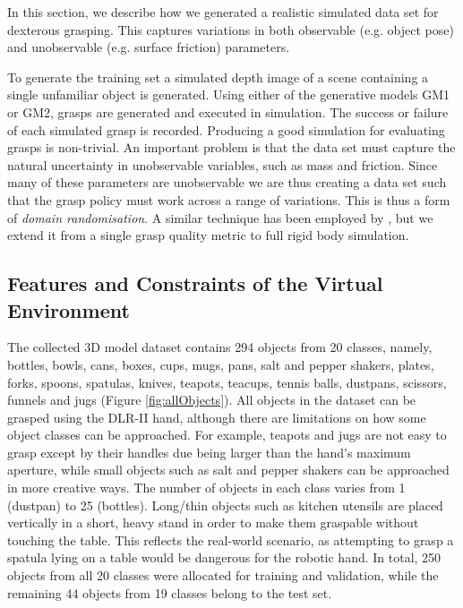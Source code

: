 In this section, we describe how we generated a realistic simulated data set for dexterous grasping. This captures variations in both observable (e.g. object pose) and unobservable (e.g. surface friction) parameters.

To generate the training set a simulated depth image of a scene containing a single unfamiliar object is generated. Using either of the generative models GM1 or GM2, grasps are generated and executed in simulation. The success or failure of each simulated grasp is recorded. Producing a good simulation for evaluating grasps is non-trivial. An important problem is that the data set must capture the natural uncertainty in unobservable variables, such as mass and friction. Since many of these parameters are unobservable we are thus creating a data set such that the grasp policy must work across a range of variations. This is thus a form of {\em domain randomisation}. A similar technique has been employed by \cite{mahler2017dex}, but we extend it from a single grasp quality metric to full rigid body simulation.

\subsection{Features and Constraints of the Virtual Environment}
\label{subsection:environment}

The collected 3D model dataset contains 294 objects from 20 classes, namely, bottles, bowls, cans, boxes, cups, mugs, pans, salt and pepper shakers, plates, forks, spoons, spatulas, knives, teapots, teacups, tennis balls, dustpans, scissors, funnels and jugs (Figure \ref{fig:allObjects}). All objects in the dataset can be grasped using the DLR-II hand, although there are limitations on how some object classes can be approached. For example, teapots and jugs are not easy to grasp except by their handles due being larger than the hand's maximum aperture, while small objects such as salt and pepper shakers can be approached in more creative ways. The number of objects in each class varies from 1 (dustpan) to 25 (bottles). Long/thin objects such as kitchen utensils are placed vertically in a short, heavy stand in order to make them graspable without touching the table. This reflects the real-world scenario, as attempting to grasp a spatula lying on a table would be dangerous for the robotic hand. In total, 250 objects from all 20 classes were allocated for training and validation, while the remaining 44 objects from 19 classes belong to the test set.

